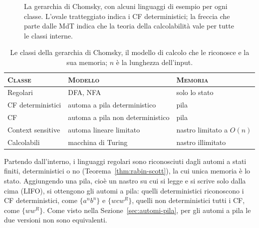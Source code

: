 \documentclass[a4paper, 11pt, oneside]{book}
\theoremstyle{formale}
\begin{document}
\begin{figure}[H]
        \caption{La gerarchia di Chomsky, con alcuni linguaggi di esempio per ogni
            classe. L'ovale tratteggiato indica i CF deterministici; la freccia che
            parte dalle MdT indica che la teoria della calcolabilit\`a vale per tutte le
            classi interne.}
        \label{fig:gerarchia-chomsky}
    \end{figure}

    \begin{table}[H]
        \centering
        \begin{tabular}{lll}
            \toprule
            \textsc{Classe} & \textsc{Modello} & \textsc{Memoria} \\
            \midrule
            Regolari & DFA, NFA & solo lo stato \\
            CF deterministici & automa a pila deterministico & pila \\
            CF & automa a pila non deterministico & pila \\
            Context sensitive & automa lineare limitato & nastro limitato a $O(n)$ \\
            Calcolabili & macchina di Turing & nastro illimitato \\
            \bottomrule
        \end{tabular}
        \caption{Le classi della gerarchia di Chomsky, il modello di calcolo che le
            riconosce e la sua memoria; $n$ \`e la lunghezza dell'input.}
        \label{tab:gerarchia-chomsky}
    \end{table}

    Partendo dall'interno, i linguaggi regolari sono riconosciuti dagli automi a stati
    finiti, deterministici o no (Teorema~\ref{thm:rabin-scott}), la cui unica memoria
    \`e lo stato. Aggiungendo una pila, cio\`e un nastro su cui si legge e si scrive
    solo dalla cima (LIFO), si ottengono gli automi a pila: quelli deterministici
    riconoscono i CF deterministici, come $\{a^n b^n\}$ e $\{w c w^R\}$, quelli non
    deterministici tutti i CF, come $\{w w^R\}$. Come visto nella
    Sezione~\ref{sec:automi-pila}, per gli automi a pila le due versioni non sono
    equivalenti.
\end{document}
